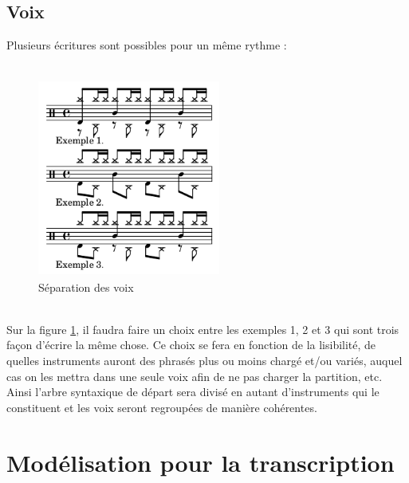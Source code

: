 \subsection*{Voix}
Plusieurs écritures sont possibles pour un même rythme :\\\\
\begin{figure}[!h]
	\centering
	\includegraphics[height=65mm, width=60mm]{z_images/description_notation/separation/0_exemples_separation.png}
	\caption{Séparation des voix}
	\label{sep_voix}
\end{figure}\\
Sur la figure \ref{sep_voix}, il faudra faire un choix entre les exemples 1, 2 et 3 qui sont trois façon d’écrire la même chose. Ce choix se fera en fonction de la lisibilité, de quelles instruments auront des phrasés plus ou moins chargé et/ou variés, auquel cas on les mettra dans une seule voix afin de ne pas charger la partition, etc.
Ainsi l’arbre syntaxique de départ sera divisé en autant d’instruments qui le constituent et les voix seront regroupées de manière cohérentes.
\section{Modélisation pour la transcription}
\label{modelisation_transcription}
